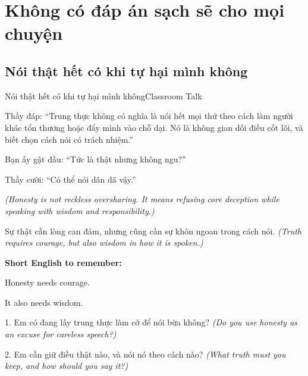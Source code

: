 \chapter{Không có đáp án sạch sẽ cho mọi chuyện}

\section{Nói thật hết có khi tự hại mình không}
\begin{truyen}{Nói thật hết có khi tự hại mình không}{Classroom Talk}

Thầy đáp: ``Trung thực không có nghĩa là nói hết mọi thứ theo cách làm người khác tổn thương hoặc đẩy mình vào chỗ dại. Nó là không gian dối điều cốt lõi, và biết chọn cách nói có trách nhiệm.''

Bạn ấy gật đầu: ``Tức là thật nhưng không ngu?''

Thầy cười: ``Có thể nói dân dã vậy.''

\textit{(Honesty is not reckless oversharing. It means refusing core deception while speaking with wisdom and responsibility.)}
\end{truyen}

\begin{baihoc}
Sự thật cần lòng can đảm, nhưng cũng cần sự khôn ngoan trong cách nói.
\textit{(Truth requires courage, but also wisdom in how it is spoken.)}
\end{baihoc}

\begin{ghinhoanh}
\textbf{Short English to remember:}

Honesty needs courage.

It also needs wisdom.
\end{ghinhoanh}

\begin{tuhocnhanh}
1. Em có đang lấy trung thực làm cớ để nói bừa không? \textit{(Do you use honesty as an excuse for careless speech?)}

2. Em cần giữ điều thật nào, và nói nó theo cách nào? \textit{(What truth must you keep, and how should you say it?)}
\end{tuhocnhanh}
\ngancach

